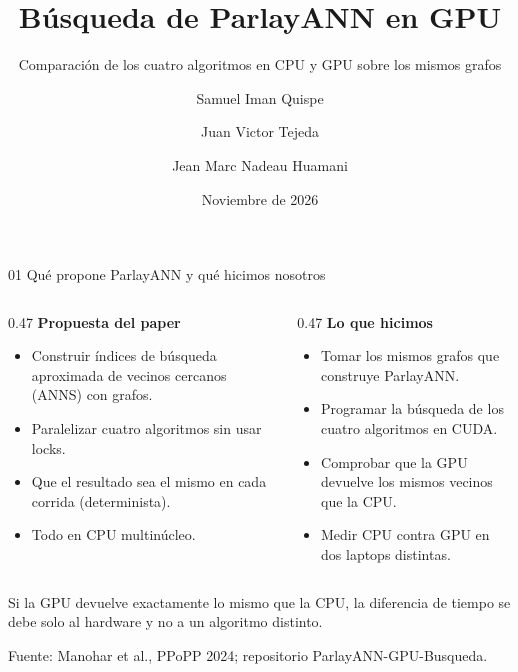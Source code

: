 \documentclass[aspectratio=169,10pt]{beamer}
\title[Búsqueda de ParlayANN en GPU]{Búsqueda de ParlayANN en GPU}
\subtitle{Comparación de los cuatro algoritmos en CPU y GPU sobre los mismos grafos}
\author[Iman, Tejeda y Nadeau]{Samuel Iman Quispe \and Juan Victor Tejeda \and Jean Marc Nadeau Huamani}
\institute[Ciencia de la Computación]{Ciencia de la Computación -- UCSP\\ Computación Paralela}
\date{Noviembre de 2026}
\newcommand{\fuente}[1]{\vfill{\scriptsize\color{gray}Fuente: #1}}
\newcommand{\nota}[1]{\begin{center}\colorbox{azul!10}{\parbox{0.94\textwidth}{\centering\small #1}}\end{center}}
\begin{document}
\begin{frame}
  \titlepage
\end{frame}

\begin{frame}{01 \quad Qué propone ParlayANN y qué hicimos nosotros}
  \begin{columns}[T]
    \begin{column}{0.47\textwidth}
      \textbf{Propuesta del paper}
      \begin{itemize}
        \item Construir índices de búsqueda aproximada de vecinos cercanos (ANNS) con grafos.
        \item Paralelizar cuatro algoritmos sin usar locks.
        \item Que el resultado sea el mismo en cada corrida (determinista).
        \item Todo en CPU multinúcleo.
      \end{itemize}
    \end{column}
    \begin{column}{0.47\textwidth}
      \textbf{Lo que hicimos}
      \begin{itemize}
        \item Tomar los mismos grafos que construye ParlayANN.
        \item Programar la búsqueda de los cuatro algoritmos en CUDA.
        \item Comprobar que la GPU devuelve los mismos vecinos que la CPU.
        \item Medir CPU contra GPU en dos laptops distintas.
      \end{itemize}
    \end{column}
  \end{columns}
  \vspace{6pt}
  \nota{Si la GPU devuelve exactamente lo mismo que la CPU, la diferencia de tiempo se
  debe solo al hardware y no a un algoritmo distinto.}
  \fuente{Manohar et al., PPoPP 2024; repositorio ParlayANN-GPU-Busqueda.}
\end{frame}
\end{document}
